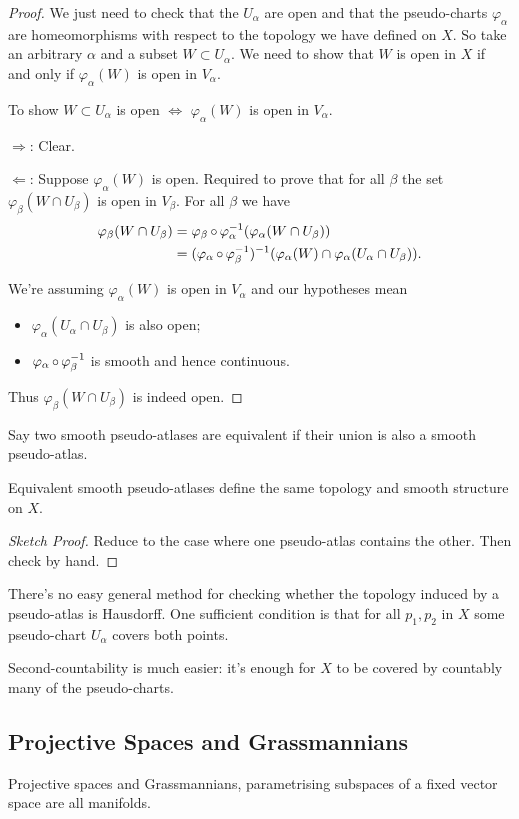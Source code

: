 \documentclass[a4paper,11pt]{article}
\begin{document}
	\begin{proof}
		We just need to check that the $U_\alpha$ are open and that the pseudo-charts $\varphi_\alpha$ are homeomorphisms with respect to the topology we have defined on $X$. So take an arbitrary $\alpha$ and a subset $W \subset U_\alpha$. We need to show that $W$ is open in $X$ if and only if $\varphi_\alpha(W)$ is open in $V_\alpha$.
		
		To show $W \subset U_\alpha$ is open $\Leftrightarrow$ $\varphi_\alpha(W)$ is open in $V_\alpha$.

		$\Rightarrow$: Clear.

		$\Leftarrow$: Suppose $\varphi_\alpha(W)$ is open. Required to prove that for all $\beta$ the set $\varphi_\beta (W\cap U_\beta)$ is open in $V_\beta$. For all $\beta$ we have
		\begin{align*}
			\varphi_\beta (W \cap U_\beta) & = \varphi_\beta \operatorname{\circ} \varphi_\alpha^{-1} ( \varphi_\alpha (W\cap U_\beta))\\
			& = (\varphi_\alpha \operatorname{\circ} \varphi_\beta^{-1})^{-1} (\varphi_\alpha(W)\cap \varphi_\alpha(U_\alpha \cap U_\beta)).
		\end{align*}

		We're assuming $\varphi_\alpha(W)$ is open in $V_\alpha$ and our hypotheses mean
		\begin{itemize}
			\item $\varphi_\alpha(U_\alpha\cap U_\beta)$ is also open;
			\item $\varphi_\alpha \operatorname{\circ} \varphi_\beta^{-1}$ is smooth and hence continuous.
		\end{itemize}

		Thus $\varphi_\beta(W \cap U_\beta)$ is indeed open.
	\end{proof}

	Say two smooth pseudo-atlases are equivalent if their union is also a smooth pseudo-atlas.

	\begin{lem}
		Equivalent smooth pseudo-atlases define the same topology and smooth structure on $X$.
	\end{lem}

	\begin{proof}[Sketch Proof]
		Reduce to the case where one pseudo-atlas contains the other. Then check by hand.
	\end{proof}

	There's no easy general method for checking whether the topology induced by a pseudo-atlas is Hausdorff. One sufficient condition is that for all $p_1,p_2$ in $X$ some pseudo-chart $U_\alpha$ covers both points.
	
	Second-countability is much easier: it's enough for $X$ to be covered by countably many of the pseudo-charts.

	\subsection{Projective Spaces and Grassmannians} 

	Projective spaces and Grassmannians, parametrising subspaces of a fixed vector space are all manifolds.
\end{document}
